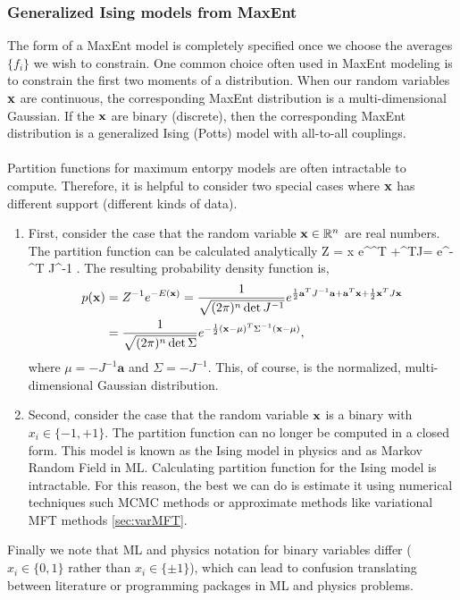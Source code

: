 \subsubsection{Generalized Ising models from MaxEnt}
The form of a MaxEnt model is completely specified once we choose the averages $\{f_i\}$ we wish to constrain. One common choice often used in MaxEnt modeling is to constrain the first two moments of a distribution. When our random variables $\mathbf{x}$ are continuous, the corresponding MaxEnt distribution is a multi-dimensional Gaussian. If the $\mathbf{x}$ are binary (discrete), then the corresponding MaxEnt distribution is a generalized Ising (Potts) model with all-to-all couplings.\\
\\
Partition functions for maximum entorpy models are often intractable to compute. Therefore, it is helpful to consider two special cases where $\mathbf{x}$ has different support (different kinds of data). 
\begin{enumerate}
	\item First, consider the case that the random variable $\mathbf{x} \in \mathbb{R}^n$ are real numbers. The partition function can be calculated analytically
	\bse 
	Z = \int \md x e^{^T +\half {}^TJ\mx}= e^{- \half {}^T J^{-1} }.
	\ese
	The resulting probability density function is,
	\begin{align}
		\label{eq:energyCostfctMaxEntmodel}
		p(\mathbf{x}) &= Z^{-1} e^{-E(\mathbf{x})} =\frac{1}{\sqrt{(2 \pi)^n \det J^{-1}} } e^{\frac{1}{2} \mathbf{a}^T J^{-1} \mathbf{a}+ \mathbf{a}^T \mathbf{x}+ \frac{1}{2} \mathbf{x}^T J \mathbf{x} }\nonumber \\
		&=\frac{1}{\sqrt{(2 \pi)^n \det \Sigma} } e^{-\frac{1}{2} (\mathbf{x} -\mu)^T \Sigma^{-1} (\mathbf{x}-\mu)},
	\end{align} 
where $\mu=-J^{-1} \mathbf{a}$ and $\Sigma = - J^{-1}$. This, of course, is the normalized, multi-dimensional Gaussian distribution.
\item Second, consider the case that the random variable $\mathbf{x}$ is a binary with $x_i \in \{-1,+1\}$. The partition function can no longer be computed in a closed form. This model is known as the Ising model in physics and as Markov Random Field in ML. Calculating partition function for the Ising model is intractable. For this reason, the best we can do is estimate it using numerical techniques such MCMC methods  or approximate methods like variational MFT methods \ref{sec:varMFT}. 
\end{enumerate}
Finally we note that ML and physics notation for binary variables differ ($x_i \in  \{0,1\}$ rather than $x_i \in \{\pm 1\}$), which can lead to confusion translating between literature or programming packages in ML and physics problems.





